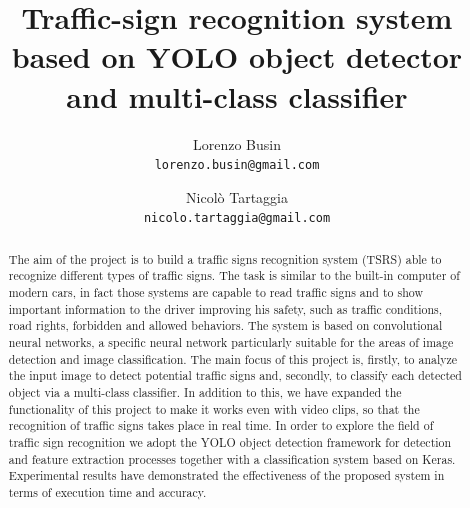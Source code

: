 \documentclass[10pt,twocolumn,letterpaper]{article}
\begin{document}
\title{Traffic-sign recognition system based on YOLO object detector and multi-class classifier}

\author{Lorenzo Busin\\
{\tt\small lorenzo.busin@gmail.com}
\and
Nicolò Tartaggia\\
{\tt\small nicolo.tartaggia@gmail.com}
}

\maketitle

%

\begin{abstract}
	The aim of the project is to build a traffic signs recognition system (TSRS) able to recognize different types of traffic signs. The task is similar to the built-in computer of modern cars, in fact those systems are capable to read traffic signs and to show important information to the driver improving his safety, such as traffic conditions, road rights, forbidden and allowed behaviors.
	The system is based on convolutional neural networks, a specific neural network particularly suitable for the areas of image detection and image classification.
	The main focus of this project is, firstly, to analyze the input image to detect potential traffic signs and, secondly, to classify each detected object via a multi-class classifier. In addition to this, we have expanded the functionality of this project to make it works even with video clips, so that the recognition of traffic signs takes place in real time. In order to explore the field of traffic sign recognition we adopt the YOLO object detection framework for detection and feature extraction processes together with a classification system based on Keras. Experimental results have demonstrated the effectiveness of the proposed system in terms of execution time and accuracy. 
\end{abstract}
\end{document}
